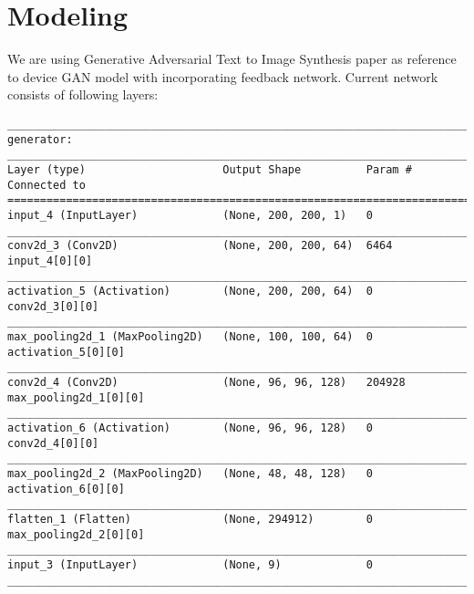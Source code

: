 \documentclass{article}
\begin{document}
\section{Modeling}
We are using Generative Adversarial Text to Image Synthesis paper as reference to device GAN model with incorporating feedback network. 
Current network consists of following layers:

\begin{verbatim}
____________________________________________________________________________________________________
generator:
____________________________________________________________________________________________________
Layer (type)                     Output Shape          Param #     Connected to                     
====================================================================================================
input_4 (InputLayer)             (None, 200, 200, 1)   0                                            
____________________________________________________________________________________________________
conv2d_3 (Conv2D)                (None, 200, 200, 64)  6464        input_4[0][0]                    
____________________________________________________________________________________________________
activation_5 (Activation)        (None, 200, 200, 64)  0           conv2d_3[0][0]                   
____________________________________________________________________________________________________
max_pooling2d_1 (MaxPooling2D)   (None, 100, 100, 64)  0           activation_5[0][0]               
____________________________________________________________________________________________________
conv2d_4 (Conv2D)                (None, 96, 96, 128)   204928      max_pooling2d_1[0][0]            
____________________________________________________________________________________________________
activation_6 (Activation)        (None, 96, 96, 128)   0           conv2d_4[0][0]                   
____________________________________________________________________________________________________
max_pooling2d_2 (MaxPooling2D)   (None, 48, 48, 128)   0           activation_6[0][0]               
____________________________________________________________________________________________________
flatten_1 (Flatten)              (None, 294912)        0           max_pooling2d_2[0][0]            
____________________________________________________________________________________________________
input_3 (InputLayer)             (None, 9)             0                                            
____________________________________________________________________________________________________

\end{verbatim}
\end{document}
